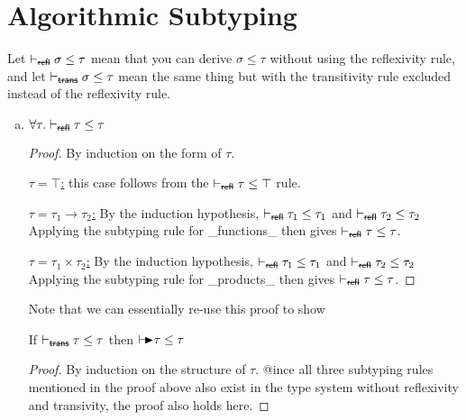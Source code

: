 \section{Algorithmic Subtyping}
\newcommand{\subtype}[2]{\vdash #1 \leq #2}
\newcommand{\subtypeNoRefl}[2]{\vdash_\text{\sout{\sf refl}} #1 \leq #2}
\newcommand{\subtypeNoTrans}[2]{\vdash_\text{\sout{\sf trans}} #1 \leq #2}
\newcommand{\algoSubtype}[2]{\vdash\hspace{-1.5mm}\RHD #1 \leq #2}

Let $\subtypeNoRefl \sigma \tau$ mean that you can derive $\sigma \leq \tau$
without using the reflexivity rule, and let $\subtypeNoTrans \sigma \tau$ mean the same
thing but with the transitivity rule excluded instead of the reflexivity rule.

\begin{enumerate}[(a)]
\item
    \begin{lemma} $\forall \tau . \subtypeNoRefl \tau \tau$ \end{lemma}
    \begin{proof} By induction on the form of $\tau$.

    \underline{$\tau = \top$:} this case follows from the $\subtypeNoRefl \tau \top$
    rule.

    \underline{$\tau = \tau_1 \rightarrow \tau_2$:} By the induction hypothesis,
    $\subtypeNoRefl{\tau_1}{\tau_1}$ and $\subtypeNoRefl{\tau_2}{\tau_2}$
    Applying the subtyping rule for _functions_ then gives
    $\subtypeNoRefl \tau \tau $.

    \underline{$\tau = \tau_1 \times \tau_2$:} By the induction hypothesis,
    $\subtypeNoRefl{\tau_1}{\tau_1}$ and $\subtypeNoRefl{\tau_2}{\tau_2}$
    Applying the subtyping rule for _products_ then gives
    $\subtypeNoRefl \tau \tau$.

    \end{proof}

    Note that we can essentially re-use this proof to show \\

    \begin{lemma} If $\subtypeNoTrans{\tau}{\tau}$ then $\algoSubtype{\tau}{\tau}$ \end{lemma}

    \begin{proof} By induction on the structure of $\tau$. @ince all three subtyping rules mentioned in the proof
    above also exist in the type system without reflexivity and transivity, the proof also holds here.
    \end{proof}


\end{enumerate}

